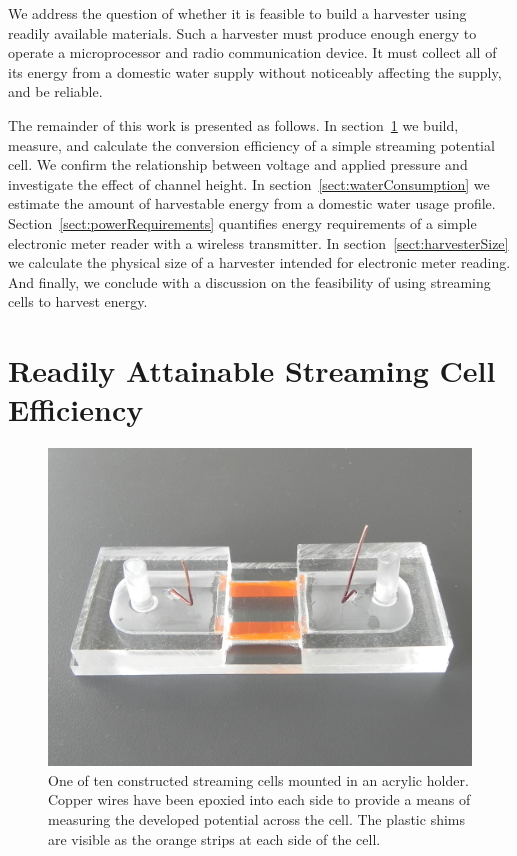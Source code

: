 \documentclass[10pt,final,journal]{IEEEtran}
\begin{document}
        We address the question of whether it is feasible to build a harvester using readily available materials.
        Such a harvester must produce enough energy to operate a microprocessor and radio communication device.
        It must collect all of its energy from a domestic water supply without noticeably affecting the supply, and be reliable.

        The remainder of this work is presented as follows.
        In section~\ref{sect:streamingCell} we build, measure, and calculate the conversion efficiency of a simple streaming potential cell.
        We confirm the relationship between voltage and applied pressure and investigate the effect of channel height.
        In section~\ref{sect:waterConsumption} we estimate the amount of harvestable energy from a domestic water usage profile.
        Section~\ref{sect:powerRequirements} quantifies energy requirements of a simple electronic meter reader with a wireless transmitter.
        In section~\ref{sect:harvesterSize} we calculate the physical size of a harvester intended for electronic meter reading.
        And finally, we conclude with a discussion on the feasibility of using streaming cells to harvest energy.

    \section{Readily Attainable Streaming Cell Efficiency} \label{sect:streamingCell}
        \begin{figure}
            \begin{center}
            \includegraphics[width=\linewidth]{Photo_streamingPotential_Assembly_Step3.JPG}
            \end{center}
            \caption{One of ten constructed streaming cells mounted in an acrylic holder. Copper wires have been epoxied into each side to provide a means of measuring the developed potential across the cell. The plastic shims are visible as the orange strips at each side of the cell.}
            \label{fig:cell}
        \end{figure}
\end{document}
